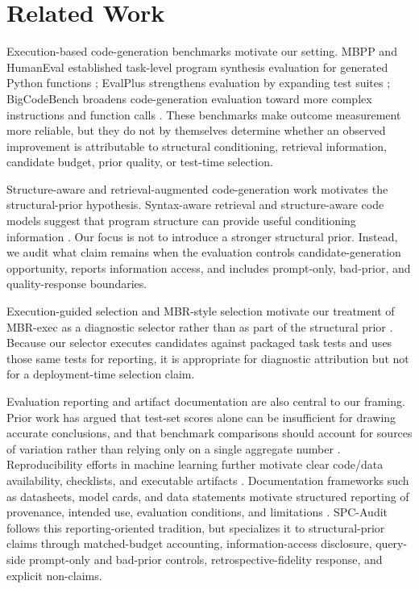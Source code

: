 \documentclass{article}
\begin{document}
\section{Related Work}
Execution-based code-generation benchmarks motivate our setting. MBPP and HumanEval established task-level program synthesis evaluation for generated Python functions \citep{austin2021program,chen2021evaluating}; EvalPlus strengthens evaluation by expanding test suites \citep{liu2023evalplus}; BigCodeBench broadens code-generation evaluation toward more complex instructions and function calls \citep{zhuo2024bigcodebench}. These benchmarks make outcome measurement more reliable, but they do not by themselves determine whether an observed improvement is attributable to structural conditioning, retrieval information, candidate budget, prior quality, or test-time selection.

Structure-aware and retrieval-augmented code-generation work motivates the structural-prior hypothesis. Syntax-aware retrieval and structure-aware code models suggest that program structure can provide useful conditioning information \citep{zhang2023syntax,tipirneni2022structcoder}. Our focus is not to introduce a stronger structural prior. Instead, we audit what claim remains when the evaluation controls candidate-generation opportunity, reports information access, and includes prompt-only, bad-prior, and quality-response boundaries.

Execution-guided selection and MBR-style selection motivate our treatment of MBR-exec as a diagnostic selector rather than as part of the structural prior \citep{shi2022execution,vamvas2024linear}. Because our selector executes candidates against packaged task tests and uses those same tests for reporting, it is appropriate for diagnostic attribution but not for a deployment-time selection claim.

Evaluation reporting and artifact documentation are also central to our framing. Prior work has argued that test-set scores alone can be insufficient for drawing accurate conclusions, and that benchmark comparisons should account for sources of variation rather than relying only on a single aggregate number \citep{dodge2019show,bouthillier2021accounting}. Reproducibility efforts in machine learning further motivate clear code/data availability, checklists, and executable artifacts \citep{pineau2021improving}. Documentation frameworks such as datasheets, model cards, and data statements motivate structured reporting of provenance, intended use, evaluation conditions, and limitations \citep{gebru2021datasheets,mitchell2019model,bender2018data}. SPC-Audit follows this reporting-oriented tradition, but specializes it to structural-prior claims through matched-budget accounting, information-access disclosure, query-side prompt-only and bad-prior controls, retrospective-fidelity response, and explicit non-claims.
\end{document}
